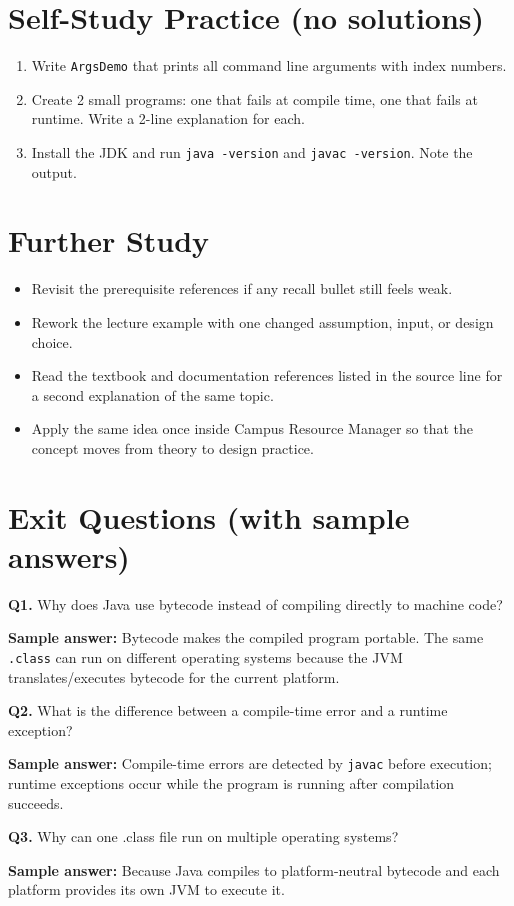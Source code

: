 \documentclass[11pt]{article}
\begin{document}
\section{Self-Study Practice (no solutions)}
\begin{enumerate}
  \item Write \texttt{ArgsDemo} that prints all command line arguments with index numbers.
  \item Create 2 small programs: one that fails at compile time, one that fails at runtime. Write a 2-line explanation for each.
  \item Install the JDK and run \texttt{java -version} and \texttt{javac -version}. Note the output.
\end{enumerate}

\section{Further Study}
\begin{itemize}
  \item Revisit the prerequisite references if any recall bullet still feels weak.
  \item Rework the lecture example with one changed assumption, input, or design choice.
  \item Read the textbook and documentation references listed in the source line for a second explanation of the same topic.
  \item Apply the same idea once inside Campus Resource Manager so that the concept moves from theory to design practice.
\end{itemize}
\notesources{\OOPSUnitISources}

\section{Exit Questions (with sample answers)}
\textbf{Q1.} Why does Java use bytecode instead of compiling directly to machine code?\par
\textbf{Sample answer:} Bytecode makes the compiled program portable. The same \texttt{.class} can run on different operating systems because the JVM translates/executes bytecode for the current platform.

\vspace{0.6em}
\textbf{Q2.} What is the difference between a compile-time error and a runtime exception?\par
\textbf{Sample answer:} Compile-time errors are detected by \texttt{javac} before execution; runtime exceptions occur while the program is running after compilation succeeds.

\vspace{0.6em}
\textbf{Q3.} Why can one .class file run on multiple operating systems?\par
\textbf{Sample answer:} Because Java compiles to platform-neutral bytecode and each platform provides its own JVM to execute it.
\end{document}
